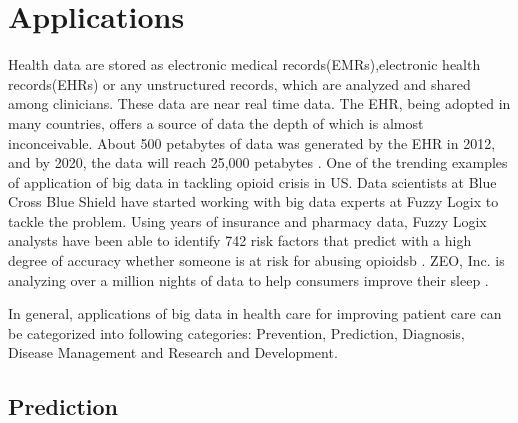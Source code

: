 \documentclass[sigconf]{acmart}
\begin{document}
\section{Applications}

Health data are stored as electronic medical records(EMRs),electronic health records(EHRs) or any unstructured records, which are 
analyzed and shared among clinicians. These data are near real time data. The EHR, being adopted in many countries, offers a source 
of data the depth of which is almost inconceivable. About 500 petabytes of data was generated by the EHR in 2012, and by 2020, the 
data will reach 25,000 petabytes \cite{www-ghdonline-org}. One of the trending examples of application of big data in tackling 
opioid crisis in US.
Data scientists at Blue Cross Blue Shield have started working with big data experts at Fuzzy Logix to tackle the problem. Using 
years of insurance and pharmacy data, Fuzzy Logix analysts have been able to identify 742 risk factors that predict with a high 
degree of accuracy whether someone is at risk for abusing opioidsb \cite{www-datapine-com}. ZEO, Inc. is analyzing over a million 
nights of data to help consumers improve their sleep \cite{www-ghdonline-org}.

In general, applications of big data in health care for improving patient care can be categorized into following categories: 
Prevention, Prediction, Diagnosis, Disease Management and Research and Development.

\subsection{Prediction}
\end{document}
